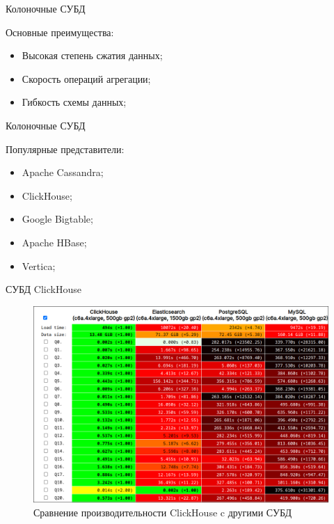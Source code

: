 \documentclass{beamer}
\begin{document}
\begin{frame}{Колоночные СУБД }

	\begin{alertblock}{Основные преимущества:}
		\begin{itemize}
			\item Высокая степень сжатия данных;
			\item Скорость операций агрегации;
			\item Гибкость схемы данных;
		\end{itemize}
	\end{alertblock}
\end{frame}

\begin{frame}{Колоночные СУБД}
	\begin{alertblock}{Популярные представители:}
		\begin{itemize}
			\item Apache Cassandra;
			\item ClickHouse;
			\item Google Bigtable;
			\item Apache HBase;
			\item Vertica;
		\end{itemize}
	\end{alertblock}
\end{frame}

\begin{frame}{СУБД ClickHouse}
	\begin{itemize}
	\end{itemize}
	\begin{figure}[H]
		\centering
		\begin{minipage}[t]{.9\textwidth}
			\centering
			\includegraphics[width=.9\textwidth]{./imgs/clickbench.png}
		\end{minipage}
		\caption{Сравнение производительности ClickHouse c другими СУБД}
	\end{figure}
\end{frame}
\end{document}
